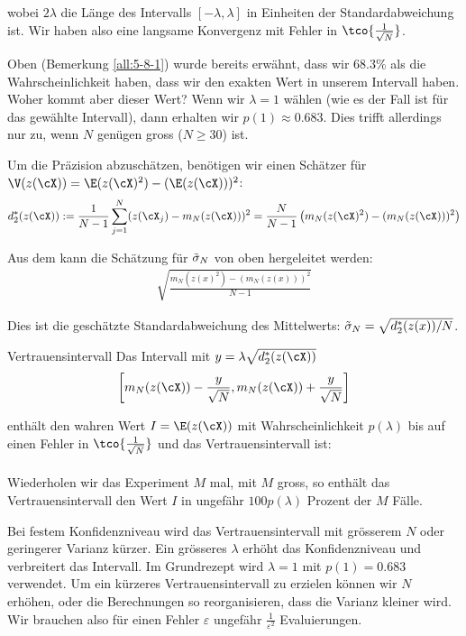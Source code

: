 \drmvspace
wobei $2\lambda$ die Länge des Intervalls $[-\lambda,\lambda]$ in Einheiten der Standardabweichung ist.
Wir haben also eine langsame Konvergenz mit Fehler in $\tco{\frac{1}{\sqrt{N}}}$.

Oben (Bemerkung \ref{all:5-8-1}) wurde bereits erwähnt, dass wir $68.3\%$ als die Wahrscheinlichkeit haben, dass wir den exakten Wert in unserem Intervall haben.
Woher kommt aber dieser Wert?
Wenn wir $\lambda = 1$ wählen (wie es der Fall ist für das gewählte Intervall), dann erhalten wir $p(1) \approx 0.683$.
Dies trifft allerdings nur zu, wenn $N$ genügen gross ($N \geq 30$) ist.

Um die Präzision abzuschätzen, benötigen wir einen Schätzer für $\V(z(\cX)) = \E(z(\cX)^2) - (\E(z(\cX)))^2$:
\rmvspace
\begin{align*}
    d^*_2(z(\cX)) := \frac{1}{N - 1} \sum_{j = 1}^{N} (z(\cX_j) - m_N(z(\cX)))^2 = \frac{N}{N - 1} \left( m_N(z(\cX)^2) - (m_N(z(\cX)))^2 \right)
\end{align*}

\drmvspace
Aus dem kann die Schätzung für $\tilde{\sigma}_N$ von oben hergeleitet werden:
\rmvspace
\begin{align*}
    \sqrt{\frac{m_N(z(x)^2) - (m_N(z(x)))^2}{N - 1}}
\end{align*}

\drmvspace
Dies ist die geschätzte Standardabweichung des Mittelwerts: $\tilde{\sigma}_N=\sqrt{d_2^*(z(x))/N}$.

\begin{theorem}[]{Vertrauensintervall}
    Das Intervall mit $y = \lambda\sqrt{d^*_2(z(\cX))}$
    \rmvspace
    \begin{align*}
        \left[ m_N(z(\cX)) - \frac{y}{\sqrt{N}}, m_N(z(\cX)) + \frac{y}{\sqrt{N}} \right]
    \end{align*}

    \rmvspace
    enthält den wahren Wert $I = \E(z(\cX))$ mit Wahrscheinlichkeit $p(\lambda)$ bis auf einen Fehler in $\tco{\frac{1}{\sqrt{N}}}$ und das Vertrauensintervall ist:
    \drmvspace
    \begin{align*}
        [m_N(z(\cX)) - \lambda \tsigma_N, m_N(z(\cX)) + \lambda \tsigma_N]
    \end{align*}
\end{theorem}
Wiederholen wir das Experiment $M$ mal, mit $M$ gross, so enthält das Vertrauensintervall den Wert $I$ in ungefähr $100 p(\lambda)$ Prozent der $M$ Fälle.

\inlineremark Bei festem Konfidenzniveau wird das Vertrauensintervall mit grösserem $N$ oder geringerer Varianz kürzer. Ein grösseres $\lambda$ erhöht das Konfidenzniveau und verbreitert das Intervall.
Im Grundrezept wird $\lambda = 1$ mit $p(1) = 0.683$ verwendet.
Um ein kürzeres Vertrauensintervall zu erzielen können wir $N$ erhöhen, oder die Berechnungen so reorganisieren, dass die Varianz kleiner wird.
Wir brauchen also für einen Fehler $\varepsilon$ ungefähr $\frac{1}{\varepsilon^2}$ Evaluierungen.

